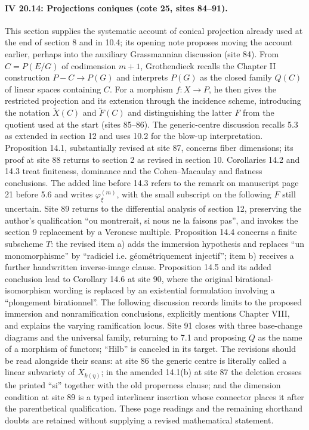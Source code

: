 \paragraph{IV 20.14: Projections coniques (cote 25, sites 84--91).}
This section supplies the systematic account of conical projection already used at the end of section 8 and in 10.4; its opening note proposes moving the account earlier, perhaps into the auxiliary Grassmannian discussion (site 84). From $C=P(E/G)$ of codimension $m+1$, Grothendieck recalls the Chapter II construction $P-C\to P(G)$ and interprets $P(G)$ as the closed family $Q(C)$ of linear spaces containing $C$. For a morphism $f:X\to P$, he then gives the restricted projection and its extension through the incidence scheme, introducing the notation $\widetilde X(C)$ and $\widetilde F(C)$ and distinguishing the latter $F$ from the quotient used at the start (sites 85--86). The generic-centre discussion recalls 5.3 as extended in section 12 and uses 10.2 for the blow-up interpretation. Proposition 14.1, substantially revised at site 87, concerns fiber dimensions; its proof at site 88 returns to section 2 as revised in section 10. Corollaries 14.2 and 14.3 treat finiteness, dominance and the Cohen--Macaulay and flatness conclusions. The added line before 14.3 refers to the remark on manuscript page 21 before 5.6 and writes $\varphi^{(m)}_\xi$, with the small subscript on the following $F$ still uncertain. Site 89 returns to the differential analysis of section 12, preserving the author's qualification ``ou montrerait, si nous ne la faisons pas'', and invokes the section 9 replacement by a Veronese multiple. Proposition 14.4 concerns a finite subscheme $T$: the revised item a) adds the immersion hypothesis and replaces ``un monomorphisme'' by ``radiciel i.e. géométriquement injectif''; item b) receives a further handwritten inverse-image clause. Proposition 14.5 and its added conclusion lead to Corollary 14.6 at site 90, where the original birational-isomorphism wording is replaced by an existential formulation involving a ``plongement birationnel''. The following discussion records limits to the proposed immersion and nonramification conclusions, explicitly mentions Chapter VIII, and explains the varying ramification locus. Site 91 closes with three base-change diagrams and the universal family, returning to 7.1 and proposing $Q$ as the name of a morphism of functors; ``Hilb'' is canceled in its target. The revisions should be read alongside their scans: at site 86 the generic centre is literally called a linear subvariety of $X_{k(\eta)}$; in the amended 14.1(b) at site 87 the deletion crosses the printed ``si'' together with the old properness clause; and the dimension condition at site 89 is a typed interlinear insertion whose connector places it after the parenthetical qualification. These page readings and the remaining shorthand doubts are retained without supplying a revised mathematical statement.
